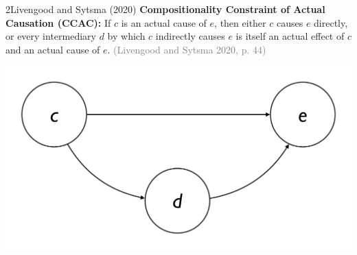 \documentclass[xcolor=table,9pt,aspectratio=169]{beamer}
\begin{document}
\begin{frame}{\vspace*{10mm}2\hspace*{1em}Livengood and Sytsma (2020)}
\vspace*{-5mm}
\textbf{Compositionality Constraint of Actual Causation (CCAC):} If $c$ is an actual cause of $e$, then either $c$ causes $e$ directly, or every intermediary $d$ by which $c$ indirectly causes $e$ is itself an actual effect of $c$ and an actual cause of $e$. \textcolor{gray}{(Livengood and Sytsma 2020, p. 44)}
\begin{center}
   \includegraphics[width=0.5\linewidth]{figures/constraint.pdf}
\end{center}
\end{frame}
\end{document}
